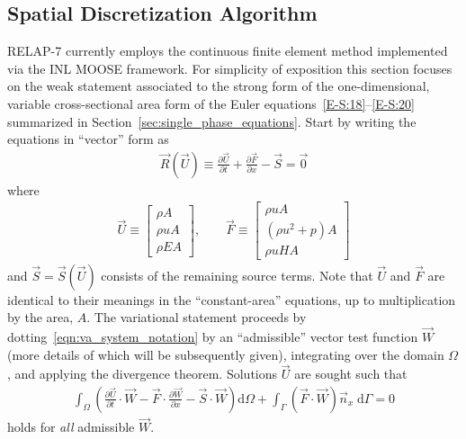 \subsection{Spatial Discretization Algorithm\label{sec:spatial_discretization}}
%
RELAP-7 currently employs the continuous finite element method implemented
via the INL MOOSE framework.  For simplicity of exposition this section focuses on
the weak statement associated to the strong form of the one-dimensional, variable
cross-sectional area form of the Euler equations~\eqref{E-S:18}--\eqref{E-S:20}
summarized in Section~\ref{sec:single_phase_equations}.  Start by writing the
equations in ``vector'' form as
\begin{align}
  \label{eqn:va_system_notation}
  \vec{R}(\vec{U}) \equiv \frac{\partial \vec{U}}{\partial t} + \frac{\partial \vec{F}}{\partial x} - \vec{S} = \vec{0}
\end{align}
where
\begin{align}
  \vec{U} \equiv
  \begin{bmatrix}
    \rho A
    \\
    \rho u A
    \\
    \rho E A
  \end{bmatrix},
  \qquad
  \vec{F} \equiv
  \begin{bmatrix}
    \rho u A
    \\
    \left(\rho u^2 + p\right) A
    \\
    \rho u H A
  \end{bmatrix}
\end{align}
and $\vec{S} = \vec{S}(\vec{U})$ consists of the remaining source
terms.  Note that $\vec{U}$ and $\vec{F}$ are identical to their
meanings in the ``constant-area'' equations, up to multiplication by
the area, $A$.
%
The variational statement proceeds by
dotting~\eqref{eqn:va_system_notation} by an ``admissible'' vector test function
$\vec{W}$ (more details of which will be subsequently given),
integrating over the domain $\Omega$, and applying the divergence
theorem.  Solutions $\vec{U}$ are sought such that
\begin{align}
  \label{eqn:va_system_weak}
  \int_{\Omega} \left(\frac{\partial \vec{U}}{\partial t} \cdot \vec{W} - \vec{F}\cdot \frac{\partial \vec{W}}{\partial x} - \vec{S}\cdot\vec{W} \right) \text{d}\Omega
  + \int_{\Gamma} \left( \vec{F} \cdot \vec{W} \right) \vec{n}_x \;\text{d}\Gamma = 0
\end{align}
holds for \emph{all} admissible $\vec{W}$.
